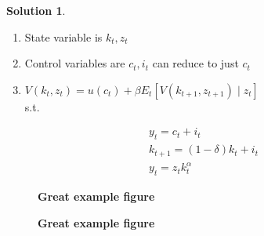 \documentclass[letterpaper,12pt]{article}
\theoremstyle{definition}
\newtheorem{solution}[theorem]{Solution}
\begin{document}
\begin{solution} ~\\
  \begin{enumerate}
  \item State variable is $k_t, z_t$
  \item Control variables are $c_t,i_t$ can reduce to just $c_t$
  \item $V(k_t,z_t) = u(c_t) + \beta E_t[V(k_{t+1},z_{t+1}) \mid z_{t}]$ \\ s.t.
  \end{enumerate}
  \begin{gather}
    y_t = c_t + i_t \\
    k_{t+1} = (1- \delta)k_t + i_t \\
    y_t = z_tk_t^\alpha
  \end{gather}
  \item 
  \begin{figure}[htb]\centering\captionsetup{width=4.0in}
    \caption{\textbf{Great example figure}}\label{}
  \end{figure}
  \begin{figure}[htb]\centering\captionsetup{width=4.0in}
    \caption{\textbf{Great example figure}}\label{}

\end{figure}
\end{solution}
\end{document}
